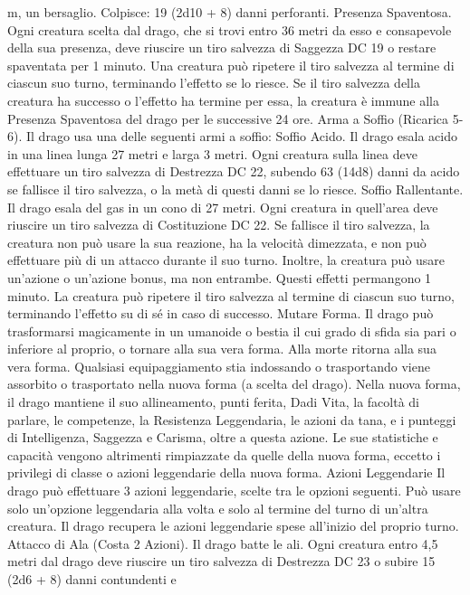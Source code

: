 \begin{multicols}{2}
m, un bersaglio.
Colpisce: 19 (2d10 + 8) danni perforanti.
Presenza Spaventosa. Ogni creatura scelta dal drago, che si trovi
entro 36 metri da esso e consapevole della sua presenza, deve
riuscire un tiro salvezza di Saggezza DC 19 o restare spaventata per
1 minuto. Una creatura può ripetere il tiro salvezza al termine di
ciascun suo turno, terminando l’effetto se lo riesce. Se il tiro salvezza
della creatura ha successo o l’effetto ha termine per essa, la creatura è
immune alla Presenza Spaventosa del drago per le successive 24 ore.
Arma a Soffio (Ricarica 5-6). Il drago usa una delle seguenti armi
a soffio:
Soffio Acido. Il drago esala acido in una linea lunga 27 metri e larga 3
metri. Ogni creatura sulla linea deve effettuare un tiro salvezza di
Destrezza DC 22, subendo 63 (14d8) danni da acido se fallisce il tiro
salvezza, o la metà di questi danni se lo riesce.
Soffio Rallentante. Il drago esala del gas in un cono di 27 metri. Ogni
creatura in quell’area deve riuscire un tiro salvezza di Costituzione
DC 22. Se fallisce il tiro salvezza, la creatura non può usare la sua
reazione, ha la velocità dimezzata, e non può effettuare più di un
attacco durante il suo turno. Inoltre, la creatura può usare un’azione o
un’azione bonus, ma non entrambe. Questi effetti permangono 1
minuto. La creatura può ripetere il tiro salvezza al termine di ciascun
suo turno, terminando l’effetto su di sé in caso di successo.
Mutare Forma. Il drago può trasformarsi magicamente in un
umanoide o bestia il cui grado di sfida sia pari o inferiore al proprio,
o tornare alla sua vera forma. Alla morte ritorna alla sua vera forma.
Qualsiasi equipaggiamento stia indossando o trasportando viene
assorbito o trasportato nella nuova forma (a scelta del drago).
Nella nuova forma, il drago mantiene il suo allineamento, punti
ferita, Dadi Vita, la facoltà di parlare, le competenze, la Resistenza
Leggendaria, le azioni da tana, e i punteggi di Intelligenza, Saggezza
e Carisma, oltre a questa azione. Le sue statistiche e capacità
vengono altrimenti rimpiazzate da quelle della nuova forma, eccetto i
privilegi di classe o azioni leggendarie della nuova forma.
Azioni Leggendarie
Il drago può effettuare 3 azioni leggendarie, scelte tra le opzioni
seguenti. Può usare solo un’opzione leggendaria alla volta e solo
al termine del turno di un’altra creatura. Il drago recupera le
azioni leggendarie spese all’inizio del proprio turno.
Attacco di Ala (Costa 2 Azioni). Il drago batte le ali. Ogni
creatura entro 4,5 metri dal drago deve riuscire un tiro salvezza
di Destrezza DC 23 o subire 15 (2d6 + 8) danni contundenti e

\end{multicols}

